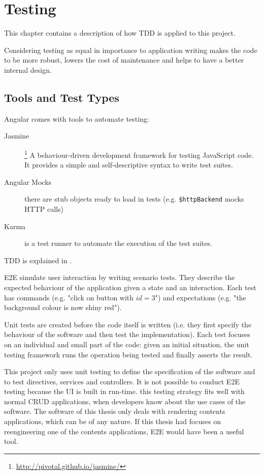 \chapter{Testing}
\label{chap:testing}
This chapter contains a description of how \ac{TDD} is applied to this project.

Considering testing as equal in importance to application writing makes the code to be more robust, lowers the cost of maintenance and helps to have a better internal design.

\section{Tools and Test Types}
Angular comes with tools to automate testing:
\begin{description}
    \item[Jasmine]\footnote{\url{http://pivotal.github.io/jasmine/}} A behaviour-driven development framework for testing JavaScript code.
    It provides a simple and self-descriptive syntax to write test suites.
    \item[Angular Mocks] there are stub objects ready to load in tests (e.g. \texttt{\$httpBackend} mocks \ac{HTTP} calls)
    \item[Karma] is a test runner to automate the execution of the test suites. 
\end{description}

\ac{TDD} is explained in .

\ac{E2E} simulate user interaction by writing scenario tests.
They describe the expected behaviour of the application given a state and an interaction.
Each test has commands (e.g. "click on button with $id = 3$") and expectations (e.g. "the background colour is now shiny red").

Unit tests are created before the code itself is written (i.e. they first specify the behaviour of the software and then test the implementation).
Each test focuses on an individual and small part of the code: given an initial situation, the unit testing framework runs the operation being tested and finally asserts the result.

This project only uses unit testing to define the specification of the software and to test directives, services and controllers.
It is not possible to conduct \ac{E2E} testing because the \ac{UI} is built in run-time.
this testing strategy fits well with normal \ac{CRUD} applications, when developers know about the use cases of the software.
The software of this thesis only deals with rendering contents applications, which can be of any nature.
If this thesis had focuses on reengineering one of the contents applications, \ac{E2E} would have been a useful tool.


